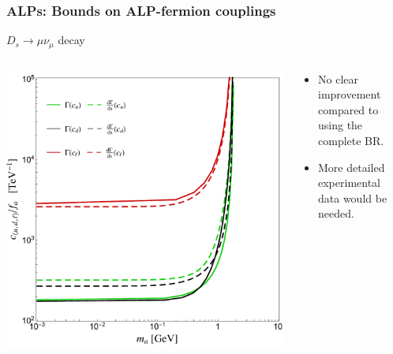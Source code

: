 \documentclass[mathserif, 10pt, dvipsnames]{beamer}
\begin{document}
\begin{frame}\frametitle{ALPs: Bounds on ALP-fermion couplings}
    $D_s \to \mu \nu_\mu$ decay
    \begin{columns}
        \begin{column}{0.5\textwidth}
            \includegraphics[width=\columnwidth]{figures/Fig3bSpro}
        \end{column}
        \begin{column}{0.5\textwidth}
            \begin{itemize}
                \item No clear improvement compared to using the complete BR.
                \item More detailed experimental data would be needed.

            \end{itemize}
        \end{column}
    \end{columns}
\end{frame}
\end{document}
